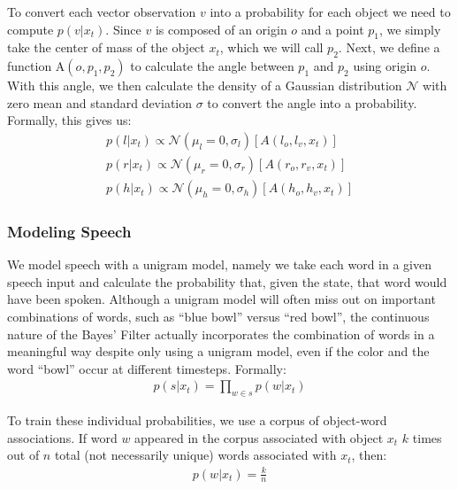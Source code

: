 \documentclass[a4paper, 11pt]{article} %
\begin{document}
To convert each vector observation $v$ into a probability for each object we need to compute $p(v | x_t)$. Since $v$ is composed of an origin $o$ and a point $p_1$, we simply take the center of mass of the object $x_t$, which we will call $p_2$. Next, we define a function $\mbox{A}(o, p_1, p_2)$ to calculate the angle between $p_1$ and $p_2$ using origin $o$. With this angle, we then calculate the density of a Gaussian  distribution $\mathcal{N}$ with zero mean and standard deviation $\sigma$ to convert the angle into a probability. Formally, this gives us:
\begin{align}
p(l | x_t) \propto \mathcal{N}(\mu_l=0, \sigma_l)[A(l_o, l_v, x_t)]\\
p(r | x_t) \propto \mathcal{N}(\mu_r=0, \sigma_r)[A(r_o, r_v, x_t)]\\
p(h | x_t) \propto \mathcal{N}(\mu_h=0, \sigma_h)[A(h_o, h_v, x_t)]
\end{align}
\subsubsection{Modeling Speech}
We model speech with a unigram model, namely we take each word in a given speech input and calculate the probability that, given the state, that word would have been spoken. Although a unigram model will often miss out on important combinations of words, such as ``blue bowl'' versus ``red bowl'', the continuous nature of the Bayes' Filter actually incorporates the combination of words in a meaningful way despite only using a unigram model, even if the color and the word ``bowl'' occur at different timesteps. Formally:
\begin{align}
p(s |x_t) = \displaystyle \prod_{w \in s} p(w | x_t)
\end{align}

To train these individual probabilities, we use a corpus of object-word associations. If word $w$ appeared in the corpus associated with object $x_t$ $k$ times out of $n$ total (not necessarily unique) words associated with $x_t$, then:
\begin{align}
p(w | x_t) = \frac{k}{n}
\end{align}
\end{document}
